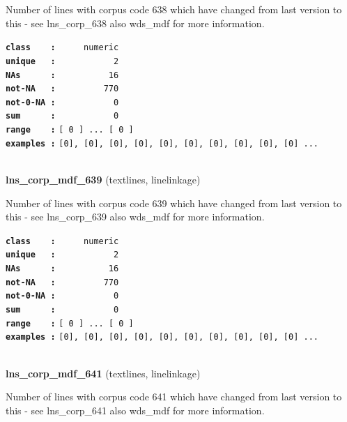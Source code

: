 \documentclass[]{article}
\begin{document}
Number of lines with corpus code 638 which have changed from last
version to this - see lns\_corp\_638 also wds\_mdf for more information.

\textbf{\texttt{class\ \ \ \ :}} \texttt{~~~~~numeric}\\
\textbf{\texttt{unique\ \ \ :}} \texttt{~~~~~~~~~~~2}\\
\textbf{\texttt{NAs\ \ \ \ \ \ :}} \texttt{~~~~~~~~~~16}\\
\textbf{\texttt{not-NA\ \ \ :}} \texttt{~~~~~~~~~770}\\
\textbf{\texttt{not-0-NA\ :}} \texttt{~~~~~~~~~~~0}\\
\textbf{\texttt{sum\ \ \ \ \ \ :}} \texttt{~~~~~~~~~~~0}\\
\textbf{\texttt{range\ \ \ \ :}}
\texttt{{[}\ 0\ {]}\ ...\ {[}\ 0\ {]}}\\
\textbf{\texttt{examples\ :}}
\texttt{{[}0{]},\ {[}0{]},\ {[}0{]},\ {[}0{]},\ {[}0{]},\ {[}0{]},\ {[}0{]},\ {[}0{]},\ {[}0{]},\ {[}0{]}\ ...}\\

~

\textbf{lns\_corp\_mdf\_639} (textlines, linelinkage)

Number of lines with corpus code 639 which have changed from last
version to this - see lns\_corp\_639 also wds\_mdf for more information.

\textbf{\texttt{class\ \ \ \ :}} \texttt{~~~~~numeric}\\
\textbf{\texttt{unique\ \ \ :}} \texttt{~~~~~~~~~~~2}\\
\textbf{\texttt{NAs\ \ \ \ \ \ :}} \texttt{~~~~~~~~~~16}\\
\textbf{\texttt{not-NA\ \ \ :}} \texttt{~~~~~~~~~770}\\
\textbf{\texttt{not-0-NA\ :}} \texttt{~~~~~~~~~~~0}\\
\textbf{\texttt{sum\ \ \ \ \ \ :}} \texttt{~~~~~~~~~~~0}\\
\textbf{\texttt{range\ \ \ \ :}}
\texttt{{[}\ 0\ {]}\ ...\ {[}\ 0\ {]}}\\
\textbf{\texttt{examples\ :}}
\texttt{{[}0{]},\ {[}0{]},\ {[}0{]},\ {[}0{]},\ {[}0{]},\ {[}0{]},\ {[}0{]},\ {[}0{]},\ {[}0{]},\ {[}0{]}\ ...}\\

~

\textbf{lns\_corp\_mdf\_641} (textlines, linelinkage)

Number of lines with corpus code 641 which have changed from last
version to this - see lns\_corp\_641 also wds\_mdf for more information.
\end{document}
